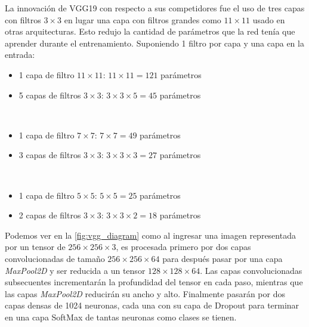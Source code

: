 La innovación de VGG19 con respecto a sus competidores fue el uso de tres capas
con filtros \( 3 \times 3 \) en lugar una capa con filtros grandes como \(11 \times
11\) usado en otras arquitecturas. Esto redujo la cantidad de parámetros
que la red tenía que aprender durante el entrenamiento. Suponiendo
1 filtro por capa y una capa en la entrada:
\leavevmode \\
\begin{itemize}
    \item 1 capa de filtro \(11 \times 11\): \(11 \times 11 = 121\) parámetros
    \item 5 capas de filtros \(3 \times 3\): \(3 \times 3 \times 5 = 45\) parámetros %
  \end{itemize}
  \leavevmode \\
\begin{itemize}
\item 1 capa de filtro \(7 \times 7\): \(7 \times 7 = 49\) parámetros
\item 3 capas de filtros \(3 \times 3\): \(3 \times 3 \times 3 = 27\) parámetros %
\end{itemize}\leavevmode \\

\begin{itemize}
\item 1 capa de filtro \(5 \times 5 \): \(5 \times 5 = 25\) parámetros
\item 2 capas de filtros \(3 \times 3\): \(3 \times 3 \times 2 = 18\) parámetros %
\end{itemize}

Podemos ver en la \autoref{fig:vgg_diagram} como al ingresar una imagen
representada por un tensor de \(256 \times 256 \times 3\), es procesada primero
por dos capas convolucionadas de tamaño \(256 \times 256 \times 64\) para después
pasar por una capa \emph{MaxPool2D} y ser reducida a un tensor \(128 \times 128
\times 64\). Las capas convolucionadas subsecuentes incrementarán la profundidad
del tensor en cada paso, mientras que las capas \emph{MaxPool2D} reducirán su
ancho y alto. Finalmente pasarán por dos capas densas de 1024 neuronas, cada una
con su capa de Dropout para terminar en una capa SoftMax de tantas neuronas como
clases se tienen.

